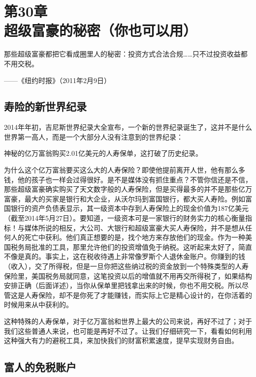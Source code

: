 
\section[第30章\q 超级富豪的秘密（你也可以用）]{第30章\\ 超级富豪的秘密（你也可以用）}

\begin{BookQuote}
那些超级富豪都把它看成圈里人的秘密：投资方式合法合规……只不过投资收益都不用交税。

\hfill ——《纽约时报》（2011年2月9日）
\end{BookQuote}

\subsection{寿险的新世界纪录}

2014年年初，吉尼斯世界纪录大全宣布，一个新的世界纪录诞生了，这并不是什么世界第一高人，而是一个大部分人没有注意到的世界纪录：

神秘的亿万富翁购买2.01亿美元的人寿保单，这打破了历史纪录。

为什么这个亿万富翁要买这么大的人寿保险？即使他提前离开人世，他有那么多钱，他的孩子也一样会过得很好。是不是媒体没有抓住重点？不管你信还是不信，那些超级富豪确实购买了天文数字般的人寿保险，但是买得最多的并不是那些亿万富豪，最大的买家是银行和大企业，从沃尔玛到富国银行，都大买人寿险。例如富国银行的资产负债表显示，其一级资本中存到人寿保险上的现金价值为187亿美元（截至2014年5月27日）。要知道，一级资本可是一家银行的财务实力的核心衡量指标！与媒体所说的相反，大公司、大银行和超级富豪大买人寿保险，并不是想从任何人的死亡中获利。他们真正想要的是，找个地方来存放他们的现金。作为一种美国税务局批准的工具，那里允许他们的投资增值免于纳税。这听起来太好了，简直不像是真的。事实上，这在税收待遇上非常像罗斯个人退休金账户。你赚到的钱（收入），交了所得税，但是一旦你把这些纳过税的资金放到一个特殊类型的人寿保险里，美国税务局就同意，这笔投资以后的增值就不用再交所得税了，如果结构安排正确（后面详述），当你从保单里把钱拿出来的时候，你也不用交税。所以尽管这是人寿保险，却不是你死了才能赚钱，而实际上它是精心设计的，在你活着的时候用来从中获利的。

这种特殊的人寿保单，对于亿万富翁和世界上最大的公司来说，再好不过了；对于我们这些普通人来说，也可能是再好不过了。让我们仔细研究一下，看看如何利用这种强大有力的避税工具，来加快我们的财富积累速度，提早实现财务自由。

\subsection{富人的免税账户}

